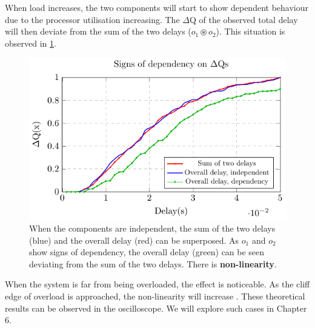         When load increases, the two components will start to show dependent behaviour due to the processor utilisation increasing. The $\Delta$Q of the observed total delay will then deviate from the sum of the two delays ($o_1 \circledast o_2$). This situation is observed in \cref{fig:cdf_indep}.
        
        \begin{figure}[H]
            \begin{center}
                \includegraphics[scale=1]{tikz/cdf_indep.pdf}
            \end{center}
            \caption{When the components are independent, the sum of the two delays (blue) and the overall delay (red) can be superposed. As $o_1$ and $o_2$ show signs of dependency, the overall delay (green) can be seen deviating from the sum of the two delays. There is \textbf{non-linearity}.}
            \label{fig:cdf_indep}%
        \end{figure}%

        When the system is far from being overloaded, the effect is noticeable. As the cliff edge of overload is approached, the non-linearity will increase \cite{post} \cite{dq-tut}. These theoretical results can be observed in the oscilloscope. We will explore such cases in Chapter 6.
